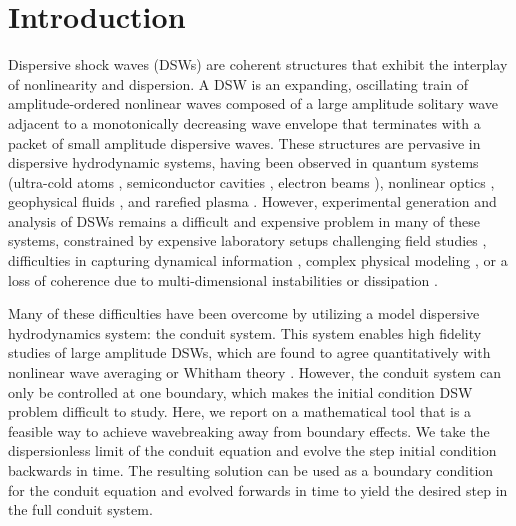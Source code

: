 \documentclass{jfm}
\begin{document}
\section{Introduction}\label{sec:Intro}
Dispersive shock waves (DSWs) are coherent structures that exhibit the interplay of nonlinearity and dispersion. A DSW is an expanding, oscillating train of amplitude-ordered nonlinear waves composed of a large amplitude solitary wave adjacent to a monotonically decreasing wave envelope that terminates with a packet of small amplitude dispersive waves. These structures are pervasive in dispersive hydrodynamic systems, having been observed in
quantum systems (ultra-cold atoms \cite{dutton_observation_2001,hoefer_dispersive_2006},
semiconductor cavities \cite{amo_polariton_2011},
electron beams \cite{mo_experimental_2013}),
nonlinear optics \cite{rothenberg_observation_1989},
geophysical fluids \cite{hammack_korteweg-vries_1978,farmer_generation_1999}, and
rarefied plasma \cite{taylor_observation_1970}. %
However, experimental generation and analysis of DSWs remains a difficult and expensive problem in many of these systems, constrained by expensive laboratory setups
\cite{dutton_observation_2001,hoefer_dispersive_2006,mo_experimental_2013,hammack_korteweg-vries_1978}
challenging field studies \cite{farmer_generation_1999},
difficulties in capturing dynamical information \cite{rothenberg_observation_1991,dutton_observation_2001,hoefer_dispersive_2006},
complex physical modeling \cite{farmer_generation_1999}, or a loss of
coherence due to multi-dimensional instabilities \cite{dutton_observation_2001,amo_polariton_2011} or
dissipation \cite{taylor_observation_1970,mo_experimental_2013}.

Many of these difficulties have been overcome by utilizing a model dispersive hydrodynamics system: the conduit system.
This system enables high fidelity studies of large amplitude DSWs,
which are found to agree quantitatively with nonlinear wave averaging
or Whitham theory
\cite{whitham_linear_1974,gurevich_nonstationary_1974,lowman_dispersive_2013,maiden_observation_2016}.
However, the conduit system can only be controlled at one boundary, which makes the initial condition DSW problem difficult to study.
Here, we report on a mathematical tool that is a feasible way to achieve wavebreaking away from boundary effects.
We take the dispersionless limit of the conduit equation and evolve the step initial condition backwards in time.
The resulting solution can be used as a boundary condition for the conduit equation and evolved forwards in time to yield the desired step in the full conduit system.
\end{document}
